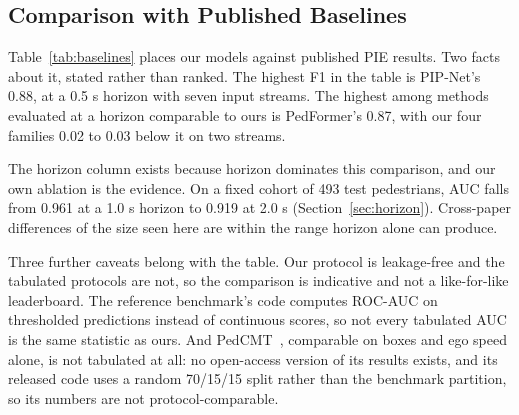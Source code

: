 \documentclass[mti,article,submit,moreauthors]{Definitions/mdpi}
\begin{document}
\subsection{Comparison with Published Baselines}

Table~\ref{tab:baselines} places our models against published PIE results. Two facts about it, stated rather than ranked. The highest F1 in the table is PIP-Net's 0.88, at a 0.5 s horizon with seven input streams. The highest among methods evaluated at a horizon comparable to ours is PedFormer's 0.87, with our four families 0.02 to 0.03 below it on two streams.

The horizon column exists because horizon dominates this comparison, and our own ablation is the evidence. On a fixed cohort of 493 test pedestrians, AUC falls from 0.961 at a 1.0 s horizon to 0.919 at 2.0 s (Section~\ref{sec:horizon}). Cross-paper differences of the size seen here are within the range horizon alone can produce.

Three further caveats belong with the table. Our protocol is leakage-free and the tabulated protocols are not, so the comparison is indicative and not a like-for-like leaderboard. The reference benchmark's code computes ROC-AUC on thresholded predictions instead of continuous scores, so not every tabulated AUC is the same statistic as ours. And PedCMT~\citep{chen2024pedcmt}, comparable on boxes and ego speed alone, is not tabulated at all: no open-access version of its results exists, and its released code uses a random 70/15/15 split rather than the benchmark partition, so its numbers are not protocol-comparable.
\end{document}
